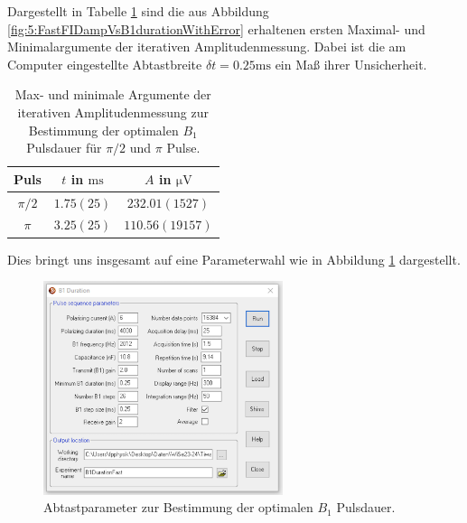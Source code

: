 \documentclass{article}
\begin{document}
            Dargestellt in Tabelle \ref{tab:5:OptiB1Duration} sind die aus Abbildung \ref{fig:5:FastFIDampVsB1durationWithError} erhaltenen ersten Maximal- und Minimalargumente der iterativen Amplitudenmessung. Dabei ist die am Computer eingestellte Abtastbreite $\delta t = 0.25\si{\ms}$ ein Maß ihrer Unsicherheit.

            \begin{table}[H]
                \centering
                \begin{tabular}{c|cc}
                    Puls & $t$ in $\si{\ms}$ & $A$ in $\si{\micro\volt}$ \\
                    \hline\hline
                    $\pi/2$ & $1.75(25)$ & $232.01(1527)$ \\
                    $\pi$ & $3.25(25)$ & $110.56(19157)$
                \end{tabular}
                \caption{Max- und minimale Argumente der iterativen Amplitudenmessung zur Bestimmung der optimalen $B_1$ Pulsdauer für $\pi/2$ und $\pi$ Pulse.}
                \label{tab:5:OptiB1Duration}
            \end{table}
            Dies bringt uns insgesamt auf eine Parameterwahl wie in Abbildung \ref{fig:5.2:Abtastparameter} dargestellt.
            \begin{figure}[H]
                \centering
                \includegraphics[width=7cm]{../Bilddateien/B1Duration_Abtastparameter.png}
                \caption{Abtastparameter zur Bestimmung der optimalen $B_1$ Pulsdauer.}
                \label{fig:5.2:Abtastparameter}
            \end{figure}
\end{document}
